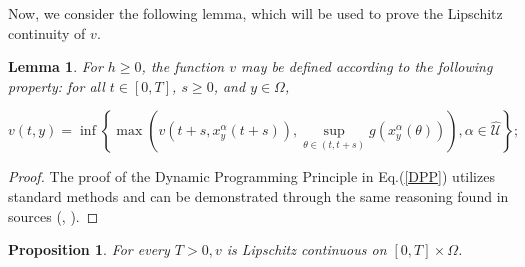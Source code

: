 \documentclass[]{interact}
\theoremstyle{plain}%
\newtheorem{lemma}[theorem]{Lemma}
\newtheorem{proposition}[theorem]{Proposition}
\theoremstyle{definition}
\theoremstyle{remark}
\begin{document}
Now, we consider the following lemma, which will be used to prove the Lipschitz continuity of $v$.

\begin{lemma}\label{3}
For $h \geq 0$, the function $v$ may be defined according to the following property: for all $t \in [0,T]$, $s \geq 0$, and $y \in \Omega$,

\begin{equation}\label{DPP}
v(t, y)=\inf \left\{\max \left(v\left(t+s, x_y^\alpha(t+s)\right), \sup_{\theta \in(t, t+s)} g\left(x_y^\alpha(\theta)\right)\right), \alpha \in  \hat{\mathcal{U}} \right\} ;
\end{equation}
\end{lemma} 


\begin{proof}
The proof of the Dynamic Programming Principle in Eq.(\ref{DPP}) utilizes standard methods and can be demonstrated through the same reasoning found in sources (\cite{barron1999viscosity}, \cite{barron1990semicontinuous}).
\end{proof}


\begin{proposition}
	For every $T>0,  v$ is Lipschitz continuous on $[0, T] \times \Omega $.
\end{proposition}
\end{document}

